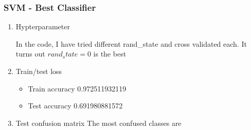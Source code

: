 \documentclass[letterpaper, 12]{article}
\begin{document}
\subsubsection{SVM - Best Classifier}
\begin{enumerate}

    \item Hypterparameter
	
	In the code, I have tried different rand\_state and cross validated each. It turns out $rand_state = 0$ is the best
	
	\item Train/test loss
	\begin{itemize}
     \item  Train accuracy  0.972511932119
     \item Test accuracy 0.691980881572
        \end{itemize}
        \item Test confusion matrix
        The most confused classes are


\end{enumerate}
\end{document}
